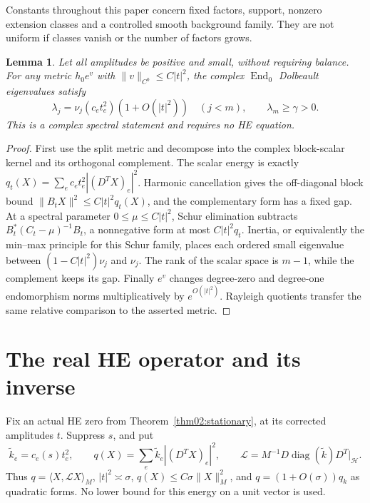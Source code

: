 \documentclass[11pt]{amsart}
\newtheorem{lemma}[theorem]{Lemma}
\theoremstyle{definition}
\theoremstyle{remark}
\newcommand{\HH}{\mathcal H}
\newcommand{\End}{\operatorname{End}}
\newcommand{\diag}{\operatorname{diag}}
\begin{document}
Constants throughout this paper concern fixed factors, support,
nonzero extension classes and a controlled smooth background family.
They are not uniform if classes vanish or the number of factors grows.

\begin{lemma}\label{lem02:amplitudespectrum}
Let all amplitudes be positive and small, without requiring balance.
For any metric \(h_0e^v\) with \(\|v\|_{C^0}\le C|t|^2\),
the complex \(\End_0\) Dolbeault eigenvalues satisfy
\[
 \lambda_j=\nu_j(c_et_e^2)(1+O(|t|^2))\quad(j<m),\qquad
 \lambda_m\ge\gamma>0.
\]
This is a complex spectral statement and requires no HE equation.
\end{lemma}

\begin{proof}
First use the split metric and decompose into the complex block-scalar
kernel and its orthogonal complement. The scalar energy is exactly
\(q_t(X)=\sum_ec_et_e^2|(D^TX)_e|^2\). Harmonic cancellation
gives the off-diagonal block bound
\(\|B_tX\|^2\le C|t|^2q_t(X)\), and the complementary form
has a fixed gap. At a spectral parameter \(0\le\mu\le C|t|^2\),
Schur elimination subtracts
\(B_t^*(C_t-\mu)^{-1}B_t\), a nonnegative form at most
\(C|t|^2q_t\). Inertia, or equivalently the min--max principle
for this Schur family, places each ordered small eigenvalue between
\((1-C|t|^2)\nu_j\) and \(\nu_j\). The rank of the scalar
space is \(m-1\), while the complement keeps its gap.
Finally \(e^v\) changes degree-zero and degree-one endomorphism
norms multiplicatively by \(e^{O(|t|^2)}\). Rayleigh quotients
transfer the same relative comparison to the asserted metric.
\end{proof}

\section{The real HE operator and its inverse}\label{sec03:inverse}

Fix an actual HE zero from Theorem~\ref{thm02:stationary}, at its
corrected amplitudes \(t\). Suppress \(s\), and put
\begin{equation}\label{eq03:energy}
 \widetilde k_e=c_e(s)t_e^2,\qquad
 q(X)=\sum_e\widetilde k_e|(D^TX)_e|^2,
 \qquad \mathcal L=M^{-1}D\diag(\widetilde k)D^T\big|_{\HH}.
\end{equation}
Thus \(q=\langle X,\mathcal LX\rangle_M\),
\(|t|^2\asymp\sigma\), \(q(X)\le C\sigma\|X\|_M^2\), and
\(q=(1+O(\sigma))q_k\) as quadratic forms.
No lower bound for this energy on a unit vector is used.
\end{document}
